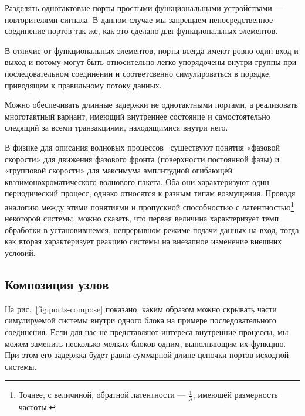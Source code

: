\begin{enumerate*}
    \item Разделять однотактовые порты простыми функциональными устройствами — повторителями сигнала. В данном случае мы запрещаем непосредственное соединение портов так же, как это сделано для функциональных элементов.
    \item В отличие от функциональных элементов, порты всегда имеют ровно один вход и выход и потому могут быть относительно легко упорядочены внутри группы при последовательном соединении и соответсвенно симулироваться в порядке, приводящем к правильному потоку данных.
    \item Можно обеспечивать длинные задержки не однотактными портами, а реализовать многотактный вариант, имеющий внутреннее состояние и самостоятельно следящий за всеми транзакциями, находящимися внутри него.
\end{enumerate*}

\begin{digression}%

В физике для описания волновых процессов~\cite{sivukhin-vol5} существуют понятия «фазовой скорости» для движения фазового фронта (поверхности постоянной фазы) и «групповой скорости» для максимума амплитудной огибающей квазимонохроматического волнового пакета. Оба они характеризуют один периодический процесс, однако относятся к разным типам возмущения. Проводя аналогию между этими понятиями и пропускной способностью с латентностью\footnote{Точнее, с величиной, обратной латентности — $\frac{1}{\lambda}$, имеющей размерность частоты.} некоторой системы, можно сказать, что первая величина характеризует темп обработки в установившемся, непрерывном режиме подачи данных на вход, тогда как вторая характеризует реакцию системы на внезапное изменение внешних условий.
\end{digression}


\subsection{Композиция узлов}

На рис.~\ref{fig:ports-compose} показано, каким образом можно скрывать части симулируемой системы внутри одного блока на примере последовательного соединения. Если для нас не представляют интереса внутренние процессы, мы можем заменить несколько мелких блоков одним, выполняющим их функцию. При этом его задержка будет равна суммарной длине цепочки портов исходной системы.

